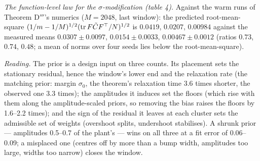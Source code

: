 \smallskip
\noindent\emph{The function-level law for the $\sigma$-modification (table 4).} Against the warm runs of Theorem
D$'''$'s numerics ($M = 2048$, last window): the predicted root-mean-square
$(1/m - 1/M)^{1/2}\allowbreak(\operatorname{tr} F\tilde CF^\top/N)^{1/2}$ is $0.0419$, $0.0207$, $0.00984$ against the measured means
$0.0307\pm0.0097$, $0.0154\pm0.0033$, $0.00467\pm0.0012$ (ratios $0.73$, $0.74$, $0.48$; a mean of norms over four
seeds lies below the root-mean-square).

\smallskip
\noindent\emph{Reading.} The prior is a design input on three counts. Its placement sets the stationary residual,
hence the window's lower end and the relaxation rate (the matching prior: margin $\sigma_0$, the theorem's
relaxation time 3.6 times shorter, the observed one 3.3 times); the amplitudes it induces set the floors (which rise
with them along the amplitude-scaled priors, so removing the bias raises the floors by 1.6--2.2 times); and the sign
of the residual it leaves at each cluster sets the admissible set of weights (overshoot splits, undershoot
stabilises). A shrunk prior --- amplitudes 0.5--0.7 of the plant's --- wins on all three at a fit error of
0.06--0.09; a misplaced one (centres off by more than a bump width, amplitudes too large, widths too narrow) closes
the window.

